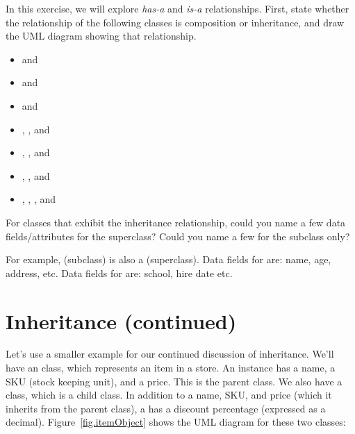 \begin{exercise}
In this exercise, we will explore {\em has-a} and {\em is-a} relationships. First, state whether the relationship of the following classes is composition or inheritance, and draw the UML diagram showing that relationship.

\begin{itemize}
    \item {} and 
    \item {} and 
    \item {} and 
    \item {}, , and 
    \item {}, , and 
    \item {}, , and 
    \item {}, , , and 
\end{itemize}

For classes that exhibit the inheritance relationship, could you name a few data fields/attributes for the superclass? Could you name a few for the subclass only?

For example,  (subclass) is also a  (superclass). 
Data fields for  are: name, age, address, etc.
Data fields for  are: school, hire date etc.

\end{exercise}

\section{Inheritance (continued)}

Let's use a smaller example for our continued discussion of inheritance.  We'll have an  class, which represents an item in a store. An  instance has a name, a SKU (stock keeping unit), and a price. This is the parent class. We also have a  class, which is a child class. In addition to a name, SKU, and price (which it inherits from the parent class), a  has a discount percentage (expressed as a decimal). Figure~\ref{fig.itemObject} shows the UML diagram for these two classes:

